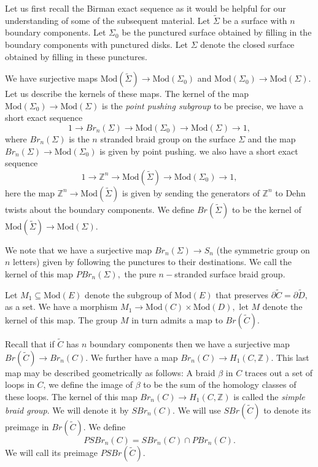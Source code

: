 \documentclass{article}
\newcommand{\ZZ}{ \mathbb{Z}}
\newcommand{\Mod}{\textrm{Mod}}
\begin{document}
Let us first recall the Birman exact sequence as it would be helpful for our understanding of some of the subsequent material. Let $\tilde \Sigma$ be a surface with $n$ boundary components. Let $\Sigma_0$ be the punctured surface obtained by filling in the boundary components with punctured disks. Let $\Sigma$ denote the closed surface obtained by filling in these punctures.

We have surjective maps $\Mod(\tilde \Sigma) \to \Mod(\Sigma_0)$ and $\Mod(\Sigma_0) \to \Mod(\Sigma).$ Let us describe the kernels of these maps. The kernel of the map $\Mod(\Sigma_0) \to \Mod(\Sigma)$ is the \emph{point pushing subgroup} to be precise, we have a short exact sequence
$$1 \to Br_n(\Sigma) \to \Mod(\Sigma_0) \to \Mod(\Sigma) \to 1,$$ where $Br_n(\Sigma)$ is the $n$ stranded braid group on the surface $\Sigma$ and the map $Br_n(\Sigma) \to \Mod(\Sigma_0)$ is given by point pushing.
we also have a short exact sequence $$1 \to \ZZ^n \to \Mod(\tilde \Sigma) \to \Mod(\Sigma_0) \to 1,$$ here the map $\ZZ^n \to \Mod(\tilde \Sigma) $ is given by sending the generators of $\ZZ^n$ to Dehn twists about the boundary components. We define $Br(\tilde \Sigma)$ to be the kernel of $\Mod(\tilde \Sigma) \to \Mod(\Sigma).$

We note that we have a surjective map $Br_n(\Sigma) \to S_n$ (the symmetric group on $n$ letters) given by following the punctures to their destinations. We call the kernel of this map $PBr_n(\Sigma),$ the pure $n-$stranded surface braid group.



Let $M_1 \subseteq \Mod(E)$ denote the subgroup of $\Mod(E)$ that preserves $\partial \tilde C  = \partial \tilde D,$ as a set. We have a morphism $M_1 \to \Mod(C) \times \Mod(D),$ let $M$ denote the kernel of this map. The group $M$ in turn admits a map to $Br(\tilde C).$ 

Recall that if $\tilde C$ has $n$ boundary components then we have a surjective map $Br(\tilde C) \to Br_n(C)$. We further have a map $Br_n(C) \to H_1(C, \ZZ).$ This last map may be described geometrically as follows: A braid $\beta$ in $C$ traces out a set of loops in $C$, we define the image of $\beta$ to be the sum of the homology classes of these loops. The kernel of this map $Br_n(C) \to H_1(C,\ZZ)$ is called the \emph{simple braid group}. We will denote it by $SBr_n(C).$ We will use $SBr(\tilde C)$ to denote its preimage in $Br(\tilde C).$  We define $$PSBr_n(C) = SBr_n(C) \cap PBr_n(C).$$ We will call its preimage $PSBr(\tilde C).$
\end{document}
